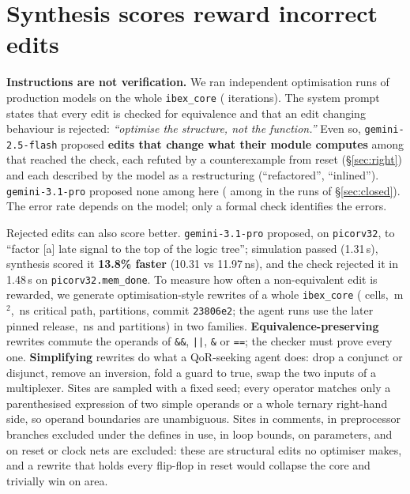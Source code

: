 \documentclass[sigconf,nonacm]{acmart}
\begin{document}
\section{Synthesis scores reward incorrect edits}
\label{sec:need}

\textbf{Instructions are not verification.} We ran \AGruns{} independent
optimisation runs of \AGmodels{} production models on the whole
\texttt{ibex\_core} (\AGiters{} iterations). The system prompt states that every
edit is checked for equivalence and that an edit changing behaviour is rejected:
\emph{``optimise the structure, not the function.''} Even so,
\texttt{gemini-2.5-flash} proposed \textbf{\AGflashBugs{} edits that change what
their module computes} among \AGflashGated{} that reached the check, each
refuted by a counterexample from reset (\S\ref{sec:right}) and each described by
the model as a restructuring (``refactored'', ``inlined''). \texttt{gemini-3.1-pro}
proposed none among \AGproGated{} here (\ABproBugs{} among \ABproGated{} in the
runs of \S\ref{sec:closed}). The error rate depends on the model; only a
formal check identifies the errors.

Rejected edits can also score better. \texttt{gemini-3.1-pro} proposed,
on \texttt{picorv32}, to ``factor [a] late signal to the top of the
logic tree''; simulation passed (1.31\,s), synthesis scored it
\textbf{13.8\% faster} (10.31 vs 11.97\,ns), and the check rejected it in
1.48\,s on \texttt{picorv32.mem\_done}. To measure how often a non-equivalent
edit is rewarded, we generate optimisation-style rewrites of a whole
\texttt{ibex\_core} (\RWbaseCells{} cells, \RWbaseArea\,\textmu m$^2$,
\RWbaseDelay\,ns critical path, \RWparts{} partitions, commit \texttt{23806e2};
the agent runs use the later pinned release, \AGbestFrom\,ns and \AGparts{}
partitions) in two families. \textbf{Equivalence-preserving} rewrites commute
the operands of \texttt{\&\&}, \texttt{||}, \texttt{\&} or \texttt{==}; the
checker must prove every one. \textbf{Simplifying} rewrites do what a
QoR-seeking agent does: drop a conjunct or disjunct, remove an inversion, fold
a guard to true, swap the two inputs of a multiplexer. Sites are sampled with a
fixed seed; every operator matches only a parenthesised expression of two simple
operands or a whole ternary right-hand side, so operand boundaries are
unambiguous. Sites in comments, in preprocessor branches excluded under the
defines in use, in loop bounds, on parameters, and on reset or clock nets are
excluded: these are structural edits no optimiser makes, and a rewrite that
holds every flip-flop in reset would collapse the core and trivially win on area.
\end{document}
